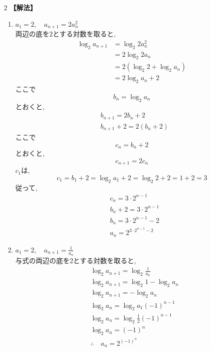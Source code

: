 \documentclass[dvipdfmx,a4paper,11pt,fleqn,openany]{jsbook}
\begin{document}
\begin{multicols*}{2}
    \noindent\textbf{【解法】}
    \begin{enumerate}[label=(\arabic*),parsep=3pt]
      \item $\displaystyle a_1=2,\quad a_{n+1}=2a_n^2$\\
            両辺の底を$2$とする対数を取ると,
            \begin{align*}
              \log_2a_{n+1}
                &=\log_2{2a_n^2}\\
                &=2\log_2{2a_n}\\
                &=2(\log_2{2}+\log_2{a_n})\\
                &=2\log_2{a_n}+2
            \end{align*}
            ここで
            \[
              b_n=\log_2a_n
            \]
            とおくと,
            \begin{align*}
              &b_{n+1}=2b_n+2\\
              &b_{n+1}+2=2(b_n+2)
            \end{align*}
            ここで
            \[
              c_n=b_n+2
            \]
            とおくと,
            \[
              c_{n+1}=2c_n
            \]
            $c_1$は,
            \[
              c_1=b_1+2=\log_2{a_1}+2=\log_2{2}+2=1+2=3
            \]
            従って,
            \begin{align*}
              &c_n=3\cdot2^{n-1}\\
              &b_n+2=3\cdot2^{n-1}\\
              &b_n=3\cdot2^{n-1}-2\\
              &a_n=2^{3\cdot2^{n-1}-2}
            \end{align*}
      \item $\displaystyle a_1=2,\quad a_{n+1}=\frac{1}{a_n}$\\
            与式の両辺の底を2とする対数を取ると,
            \begin{align*}
              &\log_2{a_{n+1}}=\log_2{\frac{1}{a_n}}\\
              &\log_2{a_{n+1}}=\log_2{1}-\log_2{a_n}\\
              &\log_2{a_{n+1}}=-\log_2{a_n}\\
              &\log_2{a_n}=\log_2{a_1}(-1)^{n-1}\\
              &\log_2{a_n}=\log_2{\frac{1}{2}}(-1)^{n-1}\\
              &\log_2{a_n}=(-1)^{n}\\
              &\therefore \quad a_n=2^{(-1)^{n}}

\end{align*}
\end{enumerate}
\end{multicols*}
\end{document}
